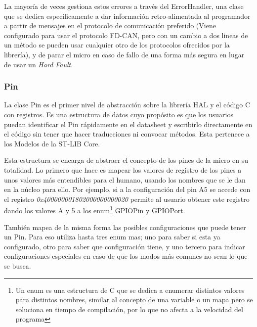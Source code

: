 \documentclass{report}
\begin{document}
La mayoría de veces gestiona estos errores a través del ErrorHandler, una clase que se dedica específicamente a dar información retro-alimentada al programador a partir de mensajes en el protocolo de comunicación preferido (Viene configurado para usar el protocolo FD-CAN, pero con un cambio a dos lineas de un método se pueden usar cualquier otro de los protocolos ofrecidos por la librería), y de parar el micro en caso de fallo de una forma más segura en lugar de usar un \textit{Hard Fault}. 

\subsubsection{Pin}
La clase Pin es el primer nivel de abstracción sobre la librería HAL y el código C con registros. Es una estructura de datos cuyo propósito es que los usuarios puedan identificar el Pin rápidamente en el datasheet y escribirlo directamente en el código sin tener que hacer traducciones ni convocar métodos. Esta pertenece a los Modelos de la ST-LIB Core.
\par \vspace{0.3 cm}
Esta estructura se encarga de abstraer el concepto de los pines de la micro en su totalidad. Lo primero que hace es mapear los valores de registro de los pines a unos valores más entendibles para el humano, usando los nombres que se le dan en la núcleo para ello. Por ejemplo, si a la configuración del pin A5 se accede con el registro \textit{0x400000001802000000000020} permite al usuario obtener este registro dando los valores A y 5 a los enum\footnote{Un enum es una estructura de C que se dedica a enumerar distintos valores para distintos nombres, similar al concepto de una variable o un mapa pero se soluciona en tiempo de compilación, por lo que no afecta a la velocidad del programa}   GPIOPin y GPIOPort. 
\par \vspace{0.3 cm}
También mapea de la misma forma las posibles configuraciones que puede tener un Pin. Para eso utiliza hasta tres enum mas; uno para saber si esta ya configurado, otro para saber que configuración tiene, y uno tercero para indicar configuraciones especiales en caso de que los modos más comunes no sean lo que se busca. 
\par \vspace{0.3 cm}
\end{document}
